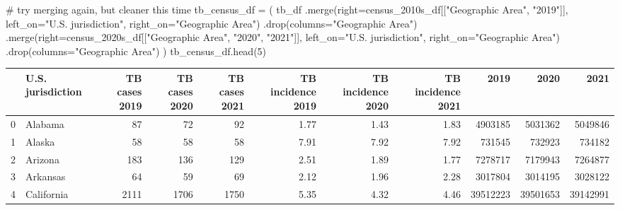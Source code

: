 \documentclass[
  letterpaper,
  DIV=11,
  numbers=noendperiod]{scrreprt}
\newenvironment{Shaded}{\begin{snugshade}}{\end{snugshade}}
\newcommand{\CommentTok}[1]{\textcolor[rgb]{0.37,0.37,0.37}{#1}}
\newcommand{\DecValTok}[1]{\textcolor[rgb]{0.68,0.00,0.00}{#1}}
\newcommand{\NormalTok}[1]{\textcolor[rgb]{0.00,0.23,0.31}{#1}}
\newcommand{\OperatorTok}[1]{\textcolor[rgb]{0.37,0.37,0.37}{#1}}
\newcommand{\StringTok}[1]{\textcolor[rgb]{0.13,0.47,0.30}{#1}}
\begin{document}
\begin{Shaded}
\begin{Highlighting}[]
\CommentTok{\# try merging again, but cleaner this time}
\NormalTok{tb\_census\_df }\OperatorTok{=}\NormalTok{ (}
\NormalTok{    tb\_df}
\NormalTok{    .merge(right}\OperatorTok{=}\NormalTok{census\_2010s\_df[[}\StringTok{"Geographic Area"}\NormalTok{, }\StringTok{"2019"}\NormalTok{]],}
\NormalTok{           left\_on}\OperatorTok{=}\StringTok{"U.S. jurisdiction"}\NormalTok{, right\_on}\OperatorTok{=}\StringTok{"Geographic Area"}\NormalTok{)}
\NormalTok{    .drop(columns}\OperatorTok{=}\StringTok{"Geographic Area"}\NormalTok{)}
\NormalTok{    .merge(right}\OperatorTok{=}\NormalTok{census\_2020s\_df[[}\StringTok{"Geographic Area"}\NormalTok{, }\StringTok{"2020"}\NormalTok{, }\StringTok{"2021"}\NormalTok{]],}
\NormalTok{           left\_on}\OperatorTok{=}\StringTok{"U.S. jurisdiction"}\NormalTok{, right\_on}\OperatorTok{=}\StringTok{"Geographic Area"}\NormalTok{)}
\NormalTok{    .drop(columns}\OperatorTok{=}\StringTok{"Geographic Area"}\NormalTok{)}
\NormalTok{)}
\NormalTok{tb\_census\_df.head(}\DecValTok{5}\NormalTok{)}
\end{Highlighting}
\end{Shaded}

\begin{tabular}{llrrrrrrrrr}
\toprule
{} & U.S. jurisdiction &  TB cases 2019 &  TB cases 2020 &  TB cases 2021 &  TB incidence 2019 &  TB incidence 2020 &  TB incidence 2021 &      2019 &      2020 &      2021 \\
\midrule
0 &           Alabama &             87 &             72 &             92 &               1.77 &               1.43 &               1.83 &   4903185 &   5031362 &   5049846 \\
1 &            Alaska &             58 &             58 &             58 &               7.91 &               7.92 &               7.92 &    731545 &    732923 &    734182 \\
2 &           Arizona &            183 &            136 &            129 &               2.51 &               1.89 &               1.77 &   7278717 &   7179943 &   7264877 \\
3 &          Arkansas &             64 &             59 &             69 &               2.12 &               1.96 &               2.28 &   3017804 &   3014195 &   3028122 \\
4 &        California &           2111 &           1706 &           1750 &               5.35 &               4.32 &               4.46 &  39512223 &  39501653 &  39142991 \\
\bottomrule
\end{tabular}
\end{document}
